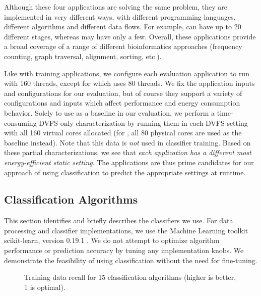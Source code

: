 Although these four applications are solving the same problem, they are implemented in very different ways, with different programming languages, different algorithms and different data flows.
For example,  can have up to 20 different stages, whereas  may have only a few.
Overall, these applications provide a broad coverage of a range of different bioinformatics approaches (frequency counting, graph traversal, alignment, sorting, etc.).

Like with training applications, we configure each evaluation application to run with 160 threads, except for  which uses 80 threads.
We fix the application inputs and configurations for our evaluation, but of course they support a variety of configurations and inputs which affect performance and energy consumption behavior.
Solely to use as a baseline in our evaluation, we perform a time-consuming DVFS-only characterization by running them in each DVFS setting with all 160 virtual cores allocated (for , all 80 physical cores are used as the baseline instead).
Note that this data is \emph{not} used in classifier training.
Based on these partial characterizations, we see that \emph{each application has a different most energy-efficient static setting}.
The applications are thus prime candidates for our approach of using classification to predict the appropriate settings at runtime.


\subsection{Classification Algorithms}

This section identifies and briefly describes the classifiers we use.
For data processing and classifier implementations, we use the Machine Learning toolkit scikit-learn, version 0.19.1 \cite{scikit-learn}.
We do not attempt to optimize algorithm performance or prediction accuracy by tuning any implementation knobs.
We demonstrate the feasibility of using classification without the need for fine-tuning.

\begin{figure}[t]
  \begin{centering}
    
    \caption{Training data recall for 15 classification algorithms (higher is better, 1 is optimal).}
    \label{fig:recall}
  \end{centering}
\end{figure}

